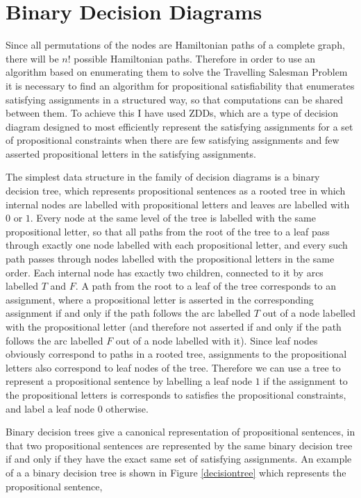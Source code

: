 \documentclass[12pt,a4paper,twoside,openright]{report}
\begin{document}
\section{Binary Decision Diagrams}
Since all permutations of the nodes are Hamiltonian paths of a complete graph, there will be $n!$ possible Hamiltonian paths. Therefore in order to use an algorithm based on enumerating them to solve the Travelling Salesman Problem it is necessary to find an algorithm for propositional satisfiability that enumerates satisfying assignments in a structured way, so that computations can be shared between them. To achieve this I have used ZDDs, which are a type of decision diagram designed to most efficiently represent the satisfying assignments for a set of propositional constraints when there are few satisfying assignments and few asserted propositional letters in the satisfying assignments.

The simplest data structure in the family of decision diagrams is a binary decision tree, which represents propositional sentences as a rooted tree in which internal nodes are labelled with propositional letters and leaves are labelled with $0$ or $1$. Every node at the same level of the tree is labelled with the same propositional letter, so that all paths from the root of the tree to a leaf pass through exactly one node labelled with each propositional letter, and every such path passes through nodes labelled with the propositional letters in the same order. Each internal node has exactly two children, connected to it by arcs labelled $T$ and $F$. A path from the root to a leaf of the tree corresponds to an assignment, where a propositional letter is asserted in the corresponding assignment if and only if the path follows the arc labelled $T$ out of a node labelled with the propositional letter (and therefore not asserted if and only if the path follows the arc labelled $F$ out of a node labelled with it). Since leaf nodes obviously correspond to paths in a rooted tree, assignments to the propositional letters also correspond to leaf nodes of the tree. Therefore we can use a tree to represent a propositional sentence by labelling a leaf node $1$ if the assignment to the propositional letters is corresponds to satisfies the propositional constraints, and label a leaf node $0$ otherwise.

Binary decision trees give a canonical representation of propositional sentences, in that two propositional sentences are represented by the same binary decision tree if and only if they have the exact same set of satisfying assignments. An example of a a binary decision tree is shown in Figure \ref{decisiontree} which represents the propositional sentence, 
\end{document}
